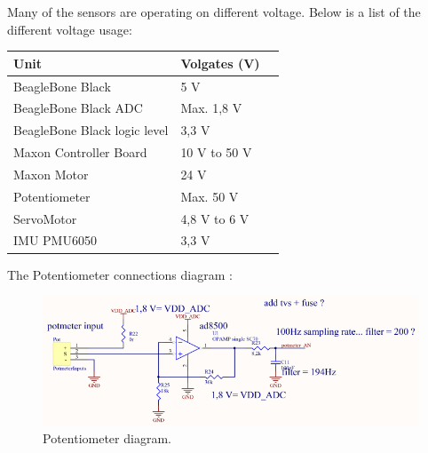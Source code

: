 Many of the sensors are operating on different voltage. Below is a list of the different voltage usage:
\begin{table}[H]
	\begin{tabular}{|l|l|p{4.3cm}|}
		\hline%
		\textbf{Unit}       &  \textbf{Volgates (V)}         \\
		\hline%
		BeagleBone Black                               & 5 V           \\
		\hline%
		BeagleBone Black ADC							  & Max. 1,8 V              \\
		\hline%
		BeagleBone Black logic level							  & 3,3 V              \\
		\hline%
		Maxon Controller Board 							  & 10 V to 50 V              \\
		\hline%
		Maxon Motor							  & 24 V             \\
		\hline%
		Potentiometer							  & Max. 50 V              \\
		\hline%
		ServoMotor							  & 4,8 V to 6 V              \\
		\hline%
		IMU PMU6050							  & 3,3 V              \\
		\hline%
	\end{tabular}
\end{table}


The Potentiometer connections diagram :\\

\begin{figure}[H]
	\centering
	\includegraphics[scale=0.92]{figures/Potmeter.pdf}
	\caption{Potentiometer diagram.}
	\label{labPotmeter}
\end{figure}\vspace{-5mm}

